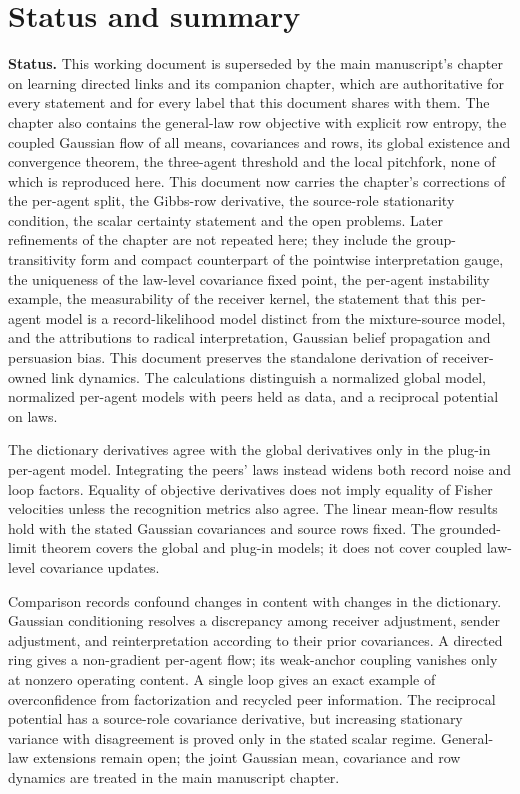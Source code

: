 \documentclass[11pt,letterpaper]{report}
\begin{document}
\hypersetup{pageanchor=false}
\hypersetup{pageanchor=true}
\chapter*{Status and summary}
\textbf{Status.} This working document is superseded by the main manuscript's chapter on learning directed links and its companion chapter, which are authoritative for every statement and for every label that this document shares with them. The chapter also contains the general-law row objective with explicit row entropy, the coupled Gaussian flow of all means, covariances and rows, its global existence and convergence theorem, the three-agent threshold and the local pitchfork, none of which is reproduced here. This document now carries the chapter's corrections of the per-agent split, the Gibbs-row derivative, the source-role stationarity condition, the scalar certainty statement and the open problems. Later refinements of the chapter are not repeated here; they include the group-transitivity form and compact counterpart of the pointwise interpretation gauge, the uniqueness of the law-level covariance fixed point, the per-agent instability example, the measurability of the receiver kernel, the statement that this per-agent model is a record-likelihood model distinct from the mixture-source model, and the attributions to radical interpretation, Gaussian belief propagation and persuasion bias. This document preserves the standalone derivation of receiver-owned link dynamics. The calculations distinguish a normalized global model, normalized per-agent models with peers held as data, and a reciprocal potential on laws.

The dictionary derivatives agree with the global derivatives only in the plug-in per-agent model. Integrating the peers' laws instead widens both record noise and loop factors. Equality of objective derivatives does not imply equality of Fisher velocities unless the recognition metrics also agree. The linear mean-flow results hold with the stated Gaussian covariances and source rows fixed. The grounded-limit theorem covers the global and plug-in models; it does not cover coupled law-level covariance updates.

Comparison records confound changes in content with changes in the dictionary. Gaussian conditioning resolves a discrepancy among receiver adjustment, sender adjustment, and reinterpretation according to their prior covariances. A directed ring gives a non-gradient per-agent flow; its weak-anchor coupling vanishes only at nonzero operating content. A single loop gives an exact example of overconfidence from factorization and recycled peer information. The reciprocal potential has a source-role covariance derivative, but increasing stationary variance with disagreement is proved only in the stated scalar regime. General-law extensions remain open; the joint Gaussian mean, covariance and row dynamics are treated in the main manuscript chapter.
\end{document}
